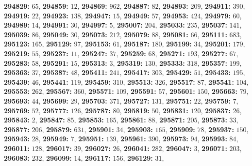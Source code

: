 \textsf{\bfseries 294829:} $65$, \textsf{\bfseries 294859:} $12$, \textsf{\bfseries 294869:} $962$, \textsf{\bfseries 294887:} $82$, \textsf{\bfseries 294893:} $209$, \textsf{\bfseries 294911:} $390$, \textsf{\bfseries 294919:} $22$, \textsf{\bfseries 294923:} $138$, \textsf{\bfseries 294947:} $15$, \textsf{\bfseries 294949:} $57$, \textsf{\bfseries 294953:} $424$, \textsf{\bfseries 294979:} $60$, \textsf{\bfseries 294989:} $14$, \textsf{\bfseries 294991:} $30$, \textsf{\bfseries 294997:} $5$, \textsf{\bfseries 295007:} $204$, \textsf{\bfseries 295033:} $235$, \textsf{\bfseries 295037:} $141$, \textsf{\bfseries 295039:} $86$, \textsf{\bfseries 295049:} $30$, \textsf{\bfseries 295073:} $212$, \textsf{\bfseries 295079:} $88$, \textsf{\bfseries 295081:} $66$, \textsf{\bfseries 295111:} $683$, \textsf{\bfseries 295123:} $165$, \textsf{\bfseries 295129:} $97$, \textsf{\bfseries 295153:} $61$, \textsf{\bfseries 295187:} $180$, \textsf{\bfseries 295199:} $34$, \textsf{\bfseries 295201:} $179$, \textsf{\bfseries 295219:} $55$, \textsf{\bfseries 295237:} $11$, \textsf{\bfseries 295247:} $37$, \textsf{\bfseries 295259:} $68$, \textsf{\bfseries 295271:} $193$, \textsf{\bfseries 295277:} $67$, \textsf{\bfseries 295283:} $58$, \textsf{\bfseries 295291:} $15$, \textsf{\bfseries 295313:} $3$, \textsf{\bfseries 295319:} $130$, \textsf{\bfseries 295333:} $318$, \textsf{\bfseries 295357:} $199$, \textsf{\bfseries 295363:} $37$, \textsf{\bfseries 295387:} $48$, \textsf{\bfseries 295411:} $241$, \textsf{\bfseries 295417:} $303$, \textsf{\bfseries 295429:} $51$, \textsf{\bfseries 295433:} $195$, \textsf{\bfseries 295439:} $46$, \textsf{\bfseries 295441:} $119$, \textsf{\bfseries 295459:} $310$, \textsf{\bfseries 295513:} $326$, \textsf{\bfseries 295517:} $87$, \textsf{\bfseries 295541:} $104$, \textsf{\bfseries 295553:} $262$, \textsf{\bfseries 295567:} $360$, \textsf{\bfseries 295571:} $109$, \textsf{\bfseries 295591:} $57$, \textsf{\bfseries 295601:} $150$, \textsf{\bfseries 295663:} $79$, \textsf{\bfseries 295693:} $44$, \textsf{\bfseries 295699:} $29$, \textsf{\bfseries 295703:} $371$, \textsf{\bfseries 295727:} $131$, \textsf{\bfseries 295751:} $22$, \textsf{\bfseries 295759:} $7$, \textsf{\bfseries 295769:} $52$, \textsf{\bfseries 295777:} $126$, \textsf{\bfseries 295787:} $80$, \textsf{\bfseries 295819:} $50$, \textsf{\bfseries 295831:} $120$, \textsf{\bfseries 295837:} $26$, \textsf{\bfseries 295843:} $2$, \textsf{\bfseries 295847:} $85$, \textsf{\bfseries 295853:} $165$, \textsf{\bfseries 295861:} $88$, \textsf{\bfseries 295871:} $205$, \textsf{\bfseries 295873:} $33$, \textsf{\bfseries 295877:} $206$, \textsf{\bfseries 295879:} $631$, \textsf{\bfseries 295901:} $34$, \textsf{\bfseries 295903:} $165$, \textsf{\bfseries 295909:} $78$, \textsf{\bfseries 295937:} $150$, \textsf{\bfseries 295943:} $28$, \textsf{\bfseries 295949:} $7$, \textsf{\bfseries 295951:} $139$, \textsf{\bfseries 295961:} $390$, \textsf{\bfseries 295973:} $94$, \textsf{\bfseries 295993:} $84$, \textsf{\bfseries 296011:} $128$, \textsf{\bfseries 296017:} $39$, \textsf{\bfseries 296027:} $26$, \textsf{\bfseries 296041:} $282$, \textsf{\bfseries 296047:} $3$, \textsf{\bfseries 296071:} $203$, \textsf{\bfseries 296083:} $232$, \textsf{\bfseries 296099:} $14$, \textsf{\bfseries 296117:} $156$, \textsf{\bfseries 296129:} $31$, 
